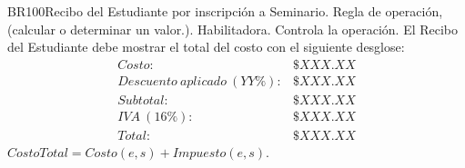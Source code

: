\begin{BusinessRule}{BR100}{Recibo del Estudiante por inscripción a Seminario.}{
		Regla de operación, (calcular o determinar un valor.).
	}{
		Habilitadora. 
	}{
		Controla la operación. %
	}
	\BRItem[Descripción:] El  Recibo del Estudiante debe mostrar el total del costo con el siguiente desglose:
	\begin{displaymath}\begin{array}{lr}
	Costo: & \$ XXX.XX\\
	Descuento~aplicado~(YY\%): & \$ XXX.XX\\
	Subtotal: & \$ XXX.XX\\
	IVA~(16\%): & \$ XXX.XX\\\hline
	Total: & \$ XXX.XX
	\end{array}\end{displaymath}
	\BRItem[Sentencia:] $CostoTotal = Costo(e, s) + Impuesto(e, s)$.
	
	
\end{BusinessRule}
